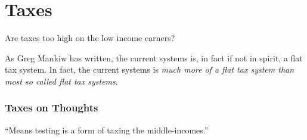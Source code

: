 \chapter{Taxes}%
\label{chpt:taxes}

Are taxes too high on the low income earners?

As Greg Mankiw has written, the current systems is, in fact if not in spirit, a
flat tax system. In fact, the current systems is \emph{much more of a flat tax
system than most so called flat tax systems}.


\subsection{Taxes on Thoughts}

``Means testing is a form of taxing the middle-incomes.''



